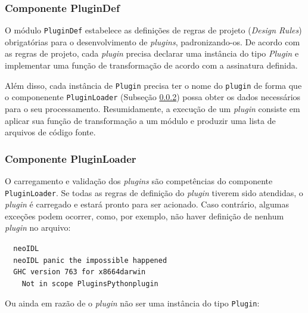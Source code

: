 \subsubsection{Componente PluginDef}{\label{sec:plugindef}}

O módulo \texttt{PluginDef} estabelece as definições de regras de projeto
(\textit{Design Rules}) obrigatórias para o desenvolvimento de
\textit{plugins}, padronizando-os. De acordo com as regras de projeto, cada
\textit{plugin} precisa declarar uma instância do tipo \emph{Plugin} e implementar uma função de
transformação de acordo com a assinatura definida.

Além disso, cada instância de  
\texttt{Plugin} precisa ter o nome do \texttt{plugin} de forma que o
componenente \texttt{PluginLoader} (Subseção \ref{compPluginLoader}) possa obter
os dados necessários para o seu processamento.
Resumidamente, a execução de um \textit{plugin} consiste em aplicar sua função
de transformação a um módulo \neoidl{} e produzir uma lista de
arquivos de código fonte. 


\subsubsection{Componente PluginLoader}
\label{compPluginLoader}

O carregamento e validação dos \textit{plugins} são competências do componente
\texttt{PluginLoader}. Se todas as regras de definição do \textit{plugin}
tiverem sido atendidas, o \textit{plugin} é carregado e estará pronto para ser
 acionado. Caso contrário, algumas exceções podem ocorrer, como, por exemplo, não haver definição de
nenhum \textit{plugin} no arquivo:
\vspace{-6mm}

\begin{tabbing}\tt
~neoIDL\\
\tt
~neoIDL~panic~the~impossible~happened\\
\tt ~~GHC~version~763~for~x8664darwin\\
\tt ~~~~Not~in~scope~PluginsPythonplugin
\end{tabbing}
\vspace{-6mm}

Ou ainda em razão de o \textit{plugin} não ser uma instância do tipo
\texttt{Plugin}:

